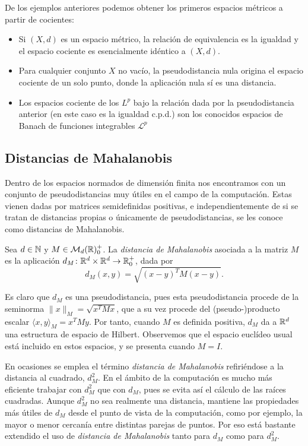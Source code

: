 \documentclass{book}
\begin{document}
De los ejemplos anteriores podemos obtener los primeros espacios métricos a partir de cocientes:

\begin{itemize}
	\item Si $(X,d)$ es un espacio métrico, la relación de equivalencia es la igualdad y el espacio cociente es esencialmente idéntico a $(X,d)$.
	\item Para cualquier conjunto $X$ no vacío, la pseudodistancia nula origina el espacio cociente de un solo punto, donde la aplicación nula sí es una distancia.
	\item Los espacios cociente de los $L^p$ bajo la relación dada por la pseudodistancia anterior (en este caso es la igualdad c.p.d.) son los conocidos espacios de Banach de funciones integrables $\mathcal{L}^p$
\end{itemize}

\subsection{Distancias de Mahalanobis}

Dentro de los espacios normados de dimensión finita nos encontramos con un conjunto de pseudodistancias muy útiles en el campo de la computación. Estas vienen dadas por matrices semidefinidas positivas, e independientemente de si se tratan de distancias propias o únicamente de pseudodistancias, se les conoce como distancias de Mahalanobis.

\begin{definition}
	Sea $d \in \mathbb{N}$ y $M \in \mathcal{M}_d(\mathbb{R})^+_0$. La \emph{distancia de Mahalanobis} asociada a la matriz $M$ es la aplicación $d_M \colon \mathbb{R}^d \times \mathbb{R}^d \to \mathbb{R}^+_0$, dada por
	\[d_M(x,y) = \sqrt{(x-y)^TM(x-y)}. \]
\end{definition}

Es claro que $d_M$ es una pseudodistancia, pues esta pseudodistancia procede de la seminorma $\|x\|_M = \sqrt{x^TMx}$, que a su vez procede del (pseudo-)producto escalar $\langle x, y \rangle_M = x^TMy$. Por tanto, cuando $M$ es definida positiva, $d_M$ da a $\mathbb{R}^d$ una estructura de espacio de Hilbert. Observemos que el espacio euclídeo usual está incluido en estos espacios, y se presenta cuando $M = I$.

En ocasiones se emplea el término \emph{distancia de Mahalanobis} refiriéndose a la distancia al cuadrado, $d_M^2$. En el ámbito de la computación es mucho más eficiente trabajar con $d_M^2$ que con $d_M$, pues se evita así el cálculo de las raíces cuadradas. Aunque $d_M^2$ no sea realmente una distancia, mantiene las propiedades más útiles de $d_M$ desde el punto de vista de la computación, como por ejemplo, la mayor o menor cercanía entre distintas parejas de puntos. Por eso está bastante extendido el uso de \emph{distancia de Mahalanobis} tanto para $d_M$ como para $d_M^2$.
\end{document}
